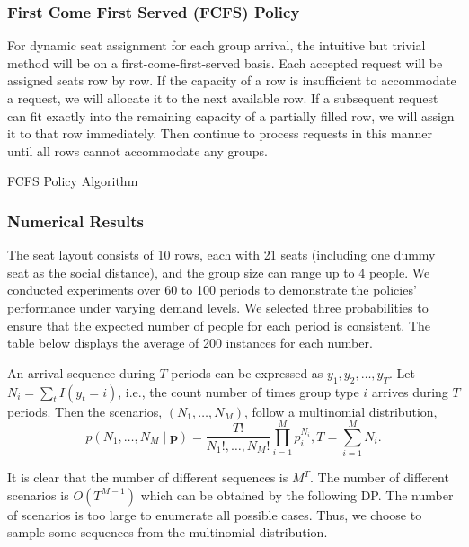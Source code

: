 \subsubsection*{First Come First Served (FCFS) Policy}
For dynamic seat assignment for each group arrival, the intuitive but trivial method will be on a first-come-first-served basis. Each accepted request will be assigned seats row by row. If the capacity of a row is insufficient to accommodate a request, we will allocate it to the next available row. If a subsequent request can fit exactly into the remaining capacity of a partially filled row, we will assign it to that row immediately. Then continue to process requests in this manner until all rows cannot accommodate any groups.

\begin{algorithm}[H]
  \caption{FCFS Policy Algorithm}\label{algo_fcfs}
\end{algorithm}

\subsubsection*{Numerical Results}
The seat layout consists of 10 rows, each with 21 seats (including one dummy seat as the social distance), and the group size can range up to 4 people. We conducted experiments over 60 to 100 periods to demonstrate the policies' performance under varying demand levels. We selected three probabilities to ensure that the expected number of people for each period is consistent. The table below displays the average of 200 instances for each number.

An arrival sequence during $T$ periods can be expressed as ${y_1, y_2, \ldots, y_T}$. Let $N_i = \sum_{t} I(y_t = i)$, i.e., the count number of times group type $i$ arrives during $T$ periods. Then the scenarios, $(N_1, \ldots, N_M)$, follow a multinomial distribution, 
$$
p\left(N_1, \ldots, N_M \mid \mathbf{p}\right)=\frac{T !}{N_{1} !, \ldots, N_{M} !} \prod_{i=1}^M p_i^{N_i}, T=\sum_{i=1}^M N_i.
$$

It is clear that the number of different sequences is $M^T$. The number of different scenarios is
$O(T^{M-1})$ which can be obtained by the following DP. The number of scenarios is too large to enumerate all possible cases. Thus, we choose to sample some sequences from the multinomial distribution.


